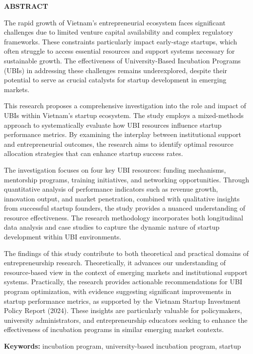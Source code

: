 \documentclass[../Main.tex]{subfiles}
\begin{document}
	\begin{center}
		\Large{\textbf{ABSTRACT}}\\
	\end{center}
	\vspace{1cm}
	The rapid growth of Vietnam's entrepreneurial ecosystem faces significant challenges due to limited venture capital availability and complex regulatory frameworks. These constraints particularly impact early-stage startups, which often struggle to access essential resources and support systems necessary for sustainable growth. The effectiveness of University-Based Incubation Programs (UBIs) in addressing these challenges remains underexplored, despite their potential to serve as crucial catalysts for startup development in emerging markets.

	This research proposes a comprehensive investigation into the role and impact of UBIs within Vietnam's startup ecosystem. The study employs a mixed-methods approach to systematically evaluate how UBI resources influence startup performance metrics. By examining the interplay between institutional support and entrepreneurial outcomes, the research aims to identify optimal resource allocation strategies that can enhance startup success rates.

	The investigation focuses on four key UBI resources: funding mechanisms, mentorship programs, training initiatives, and networking opportunities. Through quantitative analysis of performance indicators such as revenue growth, innovation output, and market penetration, combined with qualitative insights from successful startup founders, the study provides a nuanced understanding of resource effectiveness. The research methodology incorporates both longitudinal data analysis and case studies to capture the dynamic nature of startup development within UBI environments.

	The findings of this study contribute to both theoretical and practical domains of entrepreneurship research. Theoretically, it advances our understanding of resource-based view in the context of emerging markets and institutional support systems. Practically, the research provides actionable recommendations for UBI program optimization, with evidence suggesting significant improvements in startup performance metrics, as supported by the Vietnam Startup Investment Policy Report (2024). These insights are particularly valuable for policymakers, university administrators, and entrepreneurship educators seeking to enhance the effectiveness of incubation programs in similar emerging market contexts.

	\textbf{Keywords:} incubation program, university-based incubation program, startup
\end{document}
